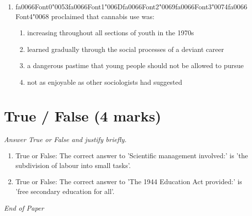 \documentclass[12pt]{article}
\begin{document}
\begin{enumerate}[label=\arabic*.]
\begin{enumerate}[label=(\alph*)]
    \item ethnic minorities practised religion to achieve social acceptance in the culture
    \item mainstream faiths were becoming increasingly identified with national identity
    \item the moral teachings of the main religions were becoming relatively similar
    \item all of the above
\end{enumerate}
\item {\csname fa0066Font0\endcsname\char"0053}{\csname fa0066Font1\endcsname\char"006D}{\csname fa0066Font2\endcsname\char"0069}{\csname fa0066Font3\endcsname\char"0074}{\csname fa0066Font4\endcsname\char"0068} proclaimed that cannabis use was:
\begin{enumerate}[label=(\alph*)]
    \item increasing throughout all sections of youth in the 1970s
    \item learned gradually through the social processes of a deviant career
    \item a dangerous pastime that young people should not be allowed to pursue
    \item not as enjoyable as other sociologists had suggested
\end{enumerate}
\end{enumerate}

\section*{True / False (4 marks)}
\textit{Answer True or False and justify briefly.}
\begin{enumerate}[label=\arabic*.]
\item True or False: The correct answer to 'Scientific management involved:' is 'the subdivision of labour into small tasks'.
\item True or False: The correct answer to 'The 1944 Education Act provided:' is 'free secondary education for all'.
\end{enumerate}

\vfill
\noindent\textit{End of Paper}
\end{document}
